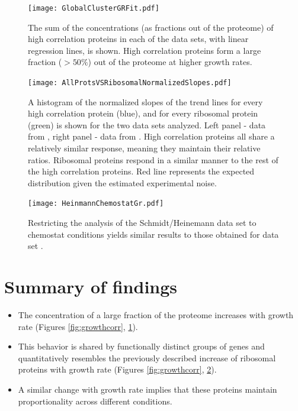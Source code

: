\documentclass[a4paper,landscape,17pt]{extarticle}
\begin{document}
\begin{figure}[h]
\centering
\texttt{[image: GlobalClusterGRFit.pdf]}
\caption{\linespread{0.5}\selectfont{}
The sum of the concentrations (as fractions out of the proteome) of high correlation proteins in each of the data sets, with linear regression lines, is shown.
High correlation proteins form a large fraction  ($>50\%$) out of the proteome at higher growth rates.
}

\label{fig:globalgrcorr}
\end{figure}
\clearpage        
\begin{figure}[h]
\centering
\texttt{[image: AllProtsVSRibosomalNormalizedSlopes.pdf]}
\caption{\linespread{0.5}\selectfont{}
    A histogram of the normalized slopes of the trend lines for every high correlation protein (blue), and for every ribosomal protein (green) is shown for the two data sets analyzed.
    Left panel - data from \parencite{Valgepea2013}, right panel - data from \parencite{Heinemann2014}.
    High correlation proteins all share a relatively similar response, meaning they maintain their relative ratios.
    Ribosomal proteins respond in a similar manner to the rest of the high correlation proteins.
    Red line represents the expected distribution given the estimated experimental noise.
}
\label{fig:globalfit}
\end{figure}
\clearpage        

\begin{figure}[h]
\centering
\texttt{[image: HeinmannChemostatGr.pdf]}
\caption{\linespread{0.5}\selectfont{}
  Restricting the analysis of the Schmidt/Heinemann data set to chemostat conditions yields similar results to those obtained for data set \parencite{Valgepea2013}.
}
\label{fig:growthcorrchemo}
\end{figure}
\clearpage        

\section*{Summary of findings}
\begin{itemize}
\item The concentration of a large fraction of the proteome increases with growth rate (Figures \ref{fig:growthcorr}, \ref{fig:globalgrcorr}).
\item This behavior is shared by functionally distinct groups of genes and quantitatively resembles the previously described increase of ribosomal proteins with growth rate (Figures \ref{fig:growthcorr}, \ref{fig:globalfit}).
\item A similar change with growth rate implies that these proteins maintain proportionality across different conditions.
\end{itemize}
\end{document}
